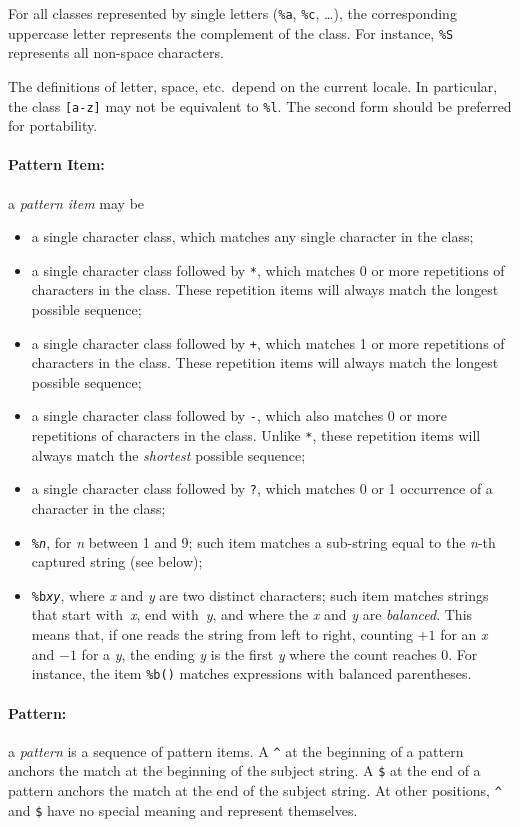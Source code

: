 \documentclass[11pt,twoside,draft]{article}
\newcommand{\M}[1]{{\rm\emph{#1}}}
\newcommand{\T}[1]{{\tt #1}}
\newcommand{\Math}[1]{$#1$}
\newcommand{\Def}[1]{\emph{#1}\index{#1}}
\begin{document}
For all classes represented by single letters (\verb|%a|, \verb|%c|, \ldots),
the corresponding uppercase letter represents the complement of the class.
For instance, \verb|%S| represents all non-space characters.

The definitions of letter, space, etc.\ depend on the current locale.
In particular, the class \verb|[a-z]| may not be equivalent to \verb|%l|.
The second form should be preferred for portability.

\paragraph{Pattern Item:}
a \Def{pattern item} may be
\begin{itemize}
\item
a single character class,
which matches any single character in the class;
\item
a single character class followed by \verb|*|,
which matches 0 or more repetitions of characters in the class.
These repetition items will always match the longest possible sequence;
\item
a single character class followed by \verb|+|,
which matches 1 or more repetitions of characters in the class.
These repetition items will always match the longest possible sequence;
\item
a single character class followed by \verb|-|,
which also matches 0 or more repetitions of characters in the class.
Unlike \verb|*|,
these repetition items will always match the \emph{shortest} possible sequence;
\item
a single character class followed by \verb|?|,
which matches 0 or 1 occurrence of a character in the class;
\item
\T{\%\M{n}}, for \M{n} between 1 and 9;
such item matches a sub-string equal to the \M{n}-th captured string
(see below);
\item
\T{\%b\M{xy}}, where \M{x} and \M{y} are two distinct characters;
such item matches strings that start with~\M{x}, end with~\M{y},
and where the \M{x} and \M{y} are \emph{balanced}.
This means that, if one reads the string from left to right,
counting \Math{+1} for an \M{x} and \Math{-1} for a \M{y},
the ending \M{y} is the first \M{y} where the count reaches 0.
For instance, the item \verb|%b()| matches expressions with
balanced parentheses.
\end{itemize}

\paragraph{Pattern:}
a \Def{pattern} is a sequence of pattern items.
A \verb|^| at the beginning of a pattern anchors the match at the
beginning of the subject string.
A \verb|$| at the end of a pattern anchors the match at the
end of the subject string.
At other positions,
\verb|^| and \verb|$| have no special meaning and represent themselves.
\end{document}

